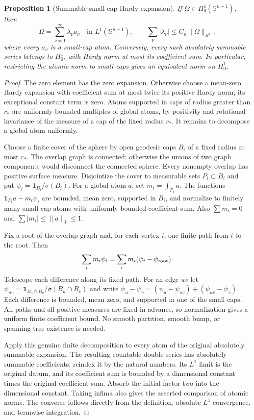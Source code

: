 \documentclass[11pt]{article}
\numberwithin{equation}{section}
\newtheorem{proposition}[theorem]{Proposition}
\theoremstyle{remark}
\theoremstyle{definition}
\begin{document}
\begin{proposition}[Summable small-cap Hardy expansion]\label{mod:atom:prop:atoms}
If $\Omega\in H^1_0(\mathbb S^{n-1})$, then
\begin{equation}\label{mod:atom:eq:atoms}
 \Omega=\sum_{\nu=1}^\infty\lambda_\nu a_\nu
 \quad\text{in }L^1(\mathbb S^{n-1}),\qquad
 \sum_\nu|\lambda_\nu|\le C_n\|\Omega\|_{H^1},
\end{equation}
where every $a_\nu$ is a small-cap atom. Conversely, every such
absolutely summable series belongs to $H^1_0$, with Hardy norm at most
its coefficient sum. In particular, restricting the atomic norm to
small caps gives an equivalent norm on $H^1_0$.
\end{proposition}
\begin{proof}
The zero element has the zero expansion.  Otherwise choose a mean-zero
Hardy expansion with coefficient sum at most twice its positive Hardy
norm; its exceptional constant term is zero.  Atoms supported in caps of radius greater than $r_*$ are uniformly
bounded multiples of global atoms, by positivity and rotational
invariance of the measure of a cap of the fixed radius $r_*$.  It remains
to decompose a global atom uniformly.

Choose a finite cover of the sphere by open geodesic caps $B_i$ of a
fixed radius at most $r_*$.  The overlap graph is connected: otherwise
the unions of two graph components would disconnect the connected
sphere.  Every nonempty overlap has positive surface measure.
Disjointize the cover to measurable sets $P_i\subset B_i$ and put
$\psi_i=\mathbf1_{B_i}/\sigma(B_i)$.  For a global atom $a$, set
$m_i=\int_{P_i}a$.  The functions
$\mathbf1_{P_i}a-m_i\psi_i$ are bounded, mean zero, supported in $B_i$,
and normalize to finitely many small-cap atoms with uniformly bounded
coefficient sum.  Also $\sum m_i=0$ and $\sum|m_i|\le\|a\|_1\le1$.

Fix a root of the overlap graph and, for each vertex $i$, one finite
path from $i$ to the root.  Then
\[
 \sum_i m_i\psi_i=\sum_i m_i(\psi_i-\psi_{\rm root}).
\]
Telescope each difference along its fixed path.  For an edge $uv$ let
$\psi_{uv}=\mathbf1_{B_u\cap B_v}/\sigma(B_u\cap B_v)$ and write
$\psi_u-\psi_v=(\psi_u-\psi_{uv})+(\psi_{uv}-\psi_v)$.
Each difference is bounded, mean zero, and supported in one of the
small caps.  All paths and all positive measures are fixed in advance,
so normalization gives a uniform finite coefficient bound.  No smooth
partition, smooth bump, or spanning-tree existence is needed.

Apply this genuine finite decomposition to every atom of the original
absolutely summable expansion.  The resulting countable double series
has absolutely summable coefficients; reindex it by the natural numbers.
Its $L^1$ limit is the original datum, and its coefficient sum is bounded
by a dimensional constant times the original coefficient sum.
Absorb the initial factor two into the dimensional constant.  Taking
infima also gives the asserted comparison of atomic norms.  The converse follows directly from the definition,
absolute $L^1$ convergence, and termwise integration.
\end{proof}
\end{document}
